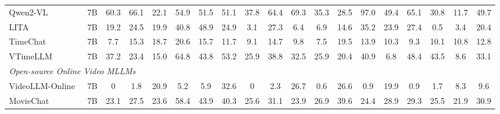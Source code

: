 \begin{table}[ht]
{\begin{tabular}{lc|cccccccccccccccc|c}
        Qwen2-VL~\cite{qwen2vl}                   & 7B                                                       & {60.3}                  & 66.1                   & 22.1                  & 54.9                   & 51.5                     & 51.1                   & 37.8                  & {64.4}                    & {69.3}                  & 35.3                  & 28.5                  & {97.0}                   & 49.4                   & 65.1                  & 30.8                    & 11.7                  & {49.7}                                      \\
        {LITA}~\cite{huang2024lita}                          & 7B                                                       &19.2	&24.5	&19.9	&40.8	&48.9	&24.9	&3.1	&27.3	&6.4	&6.9	&14.6	&35.2	&23.9	&27.4	&0.5	&3.4	&20.4
    
                         \\
        {TimeChat}~\cite{ren2024timechat}                    & 7B                                                       &7.7	&15.3	&18.7	&20.6	&15.7	&11.7	&9.1	&14.7	&9.8	&7.5	&19.5	&13.9	&10.3	&9.3	&10.1	&10.8	&12.8
                         \\
        VTimeLLM~\cite{huang2024vtimellm}                    & 7B                                                       & 37.2                  & 23.4                    & 15.0                  & 64.8                   & 43.8                     & 53.2                   & 25.9                  & 38.8                 & 32.5                  & 25.9                  & 20.4                  & 40.9                   & 6.8                    & 48.4                  & 43.5                    & 8.6                   & 33.1                                      \\
        \midrule
        \multicolumn{19}{l}{\textit{Open-source Online Video MLLMs}}                         \\
        \midrule
        {VideoLLM-Online}~\cite{chen2024videollmonline}               & 7B                                                       &0	&1.8	&20.9	&5.2	&5.9	&32.6	&0	&2.3	&26.7	&0.6	&26.6	&0.9	&19.9	&0.9	&1.7	&8.3	&9.6
                         \\
        MovieChat~\cite{song2024moviechat}                   & 7B                                                       & 23.1                  & 27.5                    & 23.6                  & 58.4                   & 43.9                     & 40.3                   & 25.6                  & 31.1                    & 23.9                  & 26.9                  & 39.6                  & 24.4                   & 28.9                   & 29.3                  & 25.5                    & 21.9                  & 30.9                                      \\

\end{tabular}}
\end{table}
